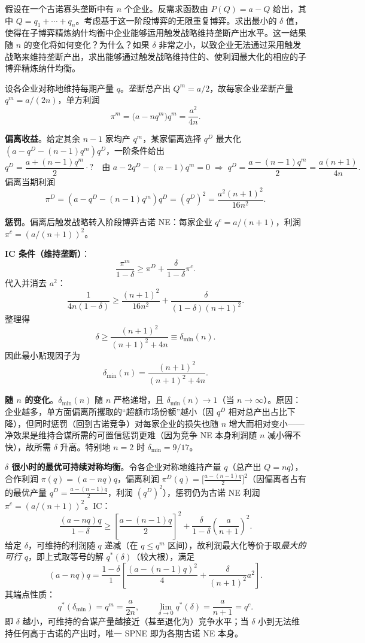 假设在一个古诺寡头垄断中有 $n$ 个企业。反需求函数由 $P(Q)=a-Q$ 给出，其中 $Q=q_1+\cdots+q_n$。考虑基于这一阶段博弈的无限重复博弈。求出最小的 $\delta$ 值，使得在子博弈精炼纳什均衡中企业能够运用触发战略维持垄断产出水平。这一结果随 $n$ 的变化将如何变化？为什么？如果 $\delta$ 非常之小，以致企业无法通过采用触发战略来维持垄断产出，求出能够通过触发战略维持住的、使利润最大化的相应的子博弈精炼纳什均衡。

\sol
设各企业对称地维持每期产量 $q$。垄断总产出 $Q^m=a/2$，故每家企业垄断产量 $q^m=a/(2n)$，单方利润
\[
\pi^m=\bigl(a-nq^m\bigr)q^m=\frac{a^2}{4n}.
\]

\textbf{偏离收益}。给定其余 $n-1$ 家均产 $q^m$，某家偏离选择 $q^D$ 最大化 $(a-q^D-(n-1)q^m)q^D$，一阶条件给出
\[
q^D=\frac{a+(n-1)q^m}{2}\cdot? \quad\text{由 }a-2q^D-(n-1)q^m=0
\;\Longrightarrow\;
q^D=\frac{a-(n-1)q^m}{2}=\frac{a(n+1)}{4n}.
\]\indent
偏离当期利润
\[
\pi^D=(a-q^D-(n-1)q^m)q^D=(q^D)^2=\frac{a^2(n+1)^2}{16n^2}.
\]

\textbf{惩罚}。偏离后触发战略转入阶段博弈古诺 NE：每家企业 $q^c=a/(n+1)$，利润 $\pi^c=(a/(n+1))^2$。

\textbf{IC 条件（维持垄断）}：
\[
\frac{\pi^m}{1-\delta}\ge \pi^D+\frac{\delta}{1-\delta}\pi^c.
\]\indent
代入并消去 $a^2$：
\[
\frac{1}{4n(1-\delta)}\ge \frac{(n+1)^2}{16n^2}+\frac{\delta}{(1-\delta)(n+1)^2}.
\]\indent
整理得
\[
\delta\ge \frac{(n+1)^2}{(n+1)^2+4n}\equiv \delta_{\min}(n).
\]\indent
因此最小贴现因子为
\[
\boxed{\delta_{\min}(n)=\frac{(n+1)^2}{(n+1)^2+4n}}.
\]

\textbf{随 $n$ 的变化}。$\delta_{\min}(n)$ 随 $n$ 严格递增，且 $\delta_{\min}(n)\to 1$（当 $n\to\infty$）。原因：企业越多，单方面偏离所攫取的“超额市场份额”越小（因 $q^D$ 相对总产出占比下降），但同时惩罚（回到古诺竞争）对每家企业的损失也随 $n$ 增大而相对变小——净效果是维持合谋所需的可置信惩罚更难（因为竞争 NE 本身利润随 $n$ 减小得不快），故所需 $\delta$ 升高。特别地 $n=2$ 时 $\delta_{\min}=9/17$。

\textbf{$\delta$ 很小时的最优可持续对称均衡}。令各企业对称地维持产量 $q$（总产出 $Q=nq$），合作利润 $\pi(q)=(a-nq)q$，偏离利润 $\pi^D(q)=\bigl[\frac{a-(n-1)q}{2}\bigr]^2$（因偏离者占有的最优产量 $q^D=\frac{a-(n-1)q}{2}$，利润 $(q^D)^2$），惩罚仍为古诺 NE 利润 $\pi^c=(a/(n+1))^2$。IC：
\[
\frac{(a-nq)q}{1-\delta}\ge \left[\frac{a-(n-1)q}{2}\right]^2+\frac{\delta}{1-\delta}\left(\frac{a}{n+1}\right)^2.
\]\indent
给定 $\delta$，可维持的利润随 $q$ 递减（在 $q\le q^m$ 区间），故利润最大化等价于取\textit{最大的可行} $q$，即上式取等号的解 $q^*(\delta)$（较大根），满足
\[
(a-nq)q=\frac{1-\delta}{1}\left[\frac{(a-(n-1)q)^2}{4}+\frac{\delta}{(n+1)^2}a^2\right].
\]\indent
其端点性质：
\[
q^*(\delta_{\min})=q^m=\frac{a}{2n},\qquad
\lim_{\delta\to 0}q^*(\delta)=\frac{a}{n+1}=q^c.
\]\indent
即 $\delta$ 越小，可维持的合谋产量越接近（甚至退化为）竞争水平；当 $\delta$ 小到无法维持任何高于古诺的产出时，唯一 SPNE 即为各期古诺 NE 本身。


